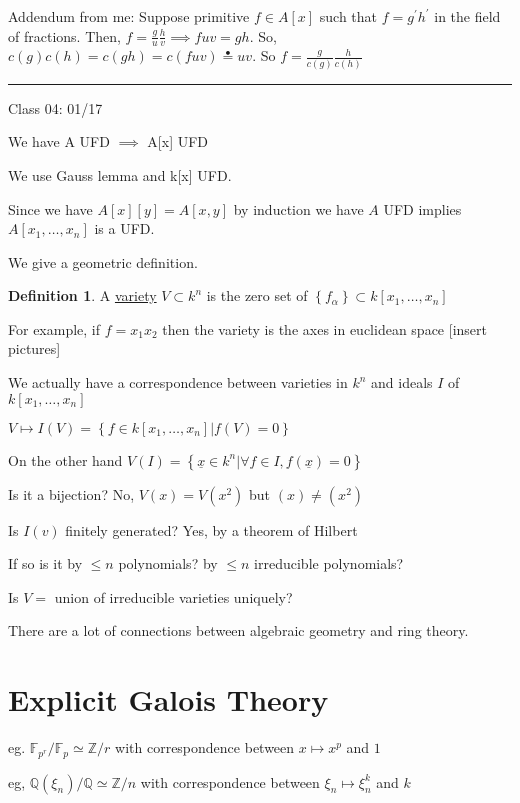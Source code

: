 \documentclass{article}
\theoremstyle{definition}
\newtheorem{definition}{Definition}
\begin{document}
Addendum from me: Suppose primitive \(f\in A[x]\) such that \(f=g^{\prime} h^{\prime} \) in the field of fractions. Then, \(f=\frac{g}{u}\frac{h}{v} \implies fuv=gh\). So, \(c(g)c(h)=c(gh)=c(fuv)\overset{\bullet}{=} uv\). So \(f=\frac{g}{c(g)}\frac{h}{c(h)}\)  

\hfil
\hrule

Class 04: 01/17

We have A UFD \(\implies \) A[x] UFD

We use Gauss lemma and k[x] UFD.

Since we have \(A[x][y]=A[x,y]\) by induction we have \(A\) UFD implies \(A[x_1, \dots, x_n ]\) is a UFD.

We give a geometric definition.

\begin{definition}
    A \underline{variety} \(V \subset k^n\) is the zero set of \(\left\{ f_\alpha  \right\} \subset k[x_1,\dots, x_n]\)  
\end{definition}

For example, if \(f=x_1 x_2\) then the variety is the axes in euclidean space [insert pictures]

We actually have a correspondence between varieties in \(k^n\) and ideals \(I\) of \(k[x_1, \dots, x_n ]\) 

\(V \mapsto I(V)=\left\{ f\in k[x_1, \dots, x_n ] | f(V)=0 \right\} \) 

On the other hand \(V(I)=\left\{ \underline{x}\in k^n | \forall f\in I, f(\underline{x}) = 0 \right\} \)  

Is it a bijection? No, \(V(x)=V(x^2)\) but \((x) \neq (x^2)\)  

Is \(I(v)\) finitely generated? Yes, by a theorem of Hilbert

If so is it by \(\leq n\) polynomials? by \(\leq n\) irreducible polynomials?

Is \(V=\) union of irreducible varieties uniquely?

There are a lot of connections between algebraic geometry and ring theory.

\section*{Explicit Galois Theory}

eg. \(\mathbb{F} _{p^r}/\mathbb{F} _p \simeq \mathbb{Z} /r\) with correspondence between \(x\mapsto x^p\) and \(1\)   

eg, \(\mathbb{Q} (\xi _n)/\mathbb{Q} \simeq \mathbb{Z} /n\) with correspondence between \(\xi _n \mapsto \xi _n^k\) and \(k\)
\end{document}

